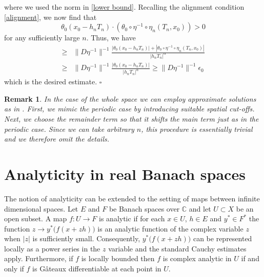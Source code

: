 \documentclass[11pt]{amsart}
\numberwithin{equation}{section}
\newtheorem{remark}[theorem]{Remark}
\begin{document}
% 
where we used the norm in \eqref{lower bound}. 
Recalling the alignment condition \eqref{alignment}, 
we now find that 
% 
\begin{equation*} 
    \theta_0(x_0-h_nT_n)\cdot\left(\theta_0\circ\eta^{-1}\circ\eta_n(T_n,x_0)\right)>0 
\end{equation*} 
% 
for any sufficiently large $n$. 
Thus, we have 
% 
\begin{equation*} 
\begin{split} 
\geq &\|D\eta^{-1}\|^{-1} \frac{|\theta_0(x_0-h_nT_n)|+|\theta_0\circ\eta^{-1}\circ\eta_n(T_n,x_0)|}{|h_nT_n|^\alpha}\\
\geq &\|D\eta^{-1}\|^{-1} \frac{|\theta_0(x_0-h_nT_n)|}{|h_nT_n|^\alpha}\geq \|D\eta^{-1}\|^{-1} \epsilon_0 
\end{split} 
\end{equation*} 
% 
which is the desired estimate. 
\hfill$\square$ 

% 
\begin{remark}
    In the case of the whole space 
    we can employ approximate solutions as in \cite{BL}. 
    First, we mimic the periodic case by introducing 
    suitable spatial cut-offs. 
    Next, we choose the remainder term so that it shifts 
    the main term just as in the periodic case. 
    Since we can take arbitrary $n$, this procedure 
    is essentially trivial and we therefore omit 
    the details. 
\end{remark} 
% 


\appendix
{}

    \section{Analyticity in real Banach spaces}\label{appendix_analyticity}
    The notion of analyticity can be extended to the setting of maps between infinite dimensional spaces. Let $E$ and $F$ be Banach spaces over $\mathbb{C}$ and let $U\subset X$ be an open subset. A map $f: U\rightarrow F$ is analytic if for each $x\in U$, $h\in E$ and $y^*\in F^*$ the function $z\rightarrow y^*\big(f(x+zh)\big)$ is an analytic function of the complex variable $z$ when $|z|$ is sufficiently small. Consequently, $y^*\big(f(x+zh)\big)$ can be represented locally as a power series in the $z$ variable and the standard Cauchy estimates apply. Furthermore, if $f$ is locally bounded then $f$ is complex analytic in $U$ if and only if $f$ is G\^ateaux differentiable at each point in $U$. 
\end{document}
